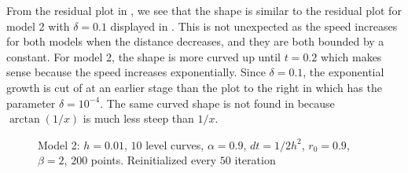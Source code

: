 From the residual plot in , we see that the shape is similar to the residual plot for model 2 with $\delta=0.1$ displayed in . This is not unexpected as the speed increases for both models when the distance decreases, and they are both bounded by a constant. For model 2, the shape is more curved up until $t=0.2$ which makes sense because the speed increases exponentially. Since $\delta=0.1$, the exponential growth is cut of at an earlier stage than the plot to the right in  which has the parameter $\delta=10^{-4}$. The same curved shape is not found in  because $\arctan(1/x)$ is much less steep than $1/x$.

\begin{figure}
    \begin{center}
    \end{center}
    \vspace{-2.5em}
    \caption[Model 3 - Circular example, $\alpha=0.9$]{Model 2: $h=0.01$, $10$ level curves, $\alpha=0.9$, $dt=1/2 h^2$, $r_0=0.9$, $\beta=2$, $200$ points. Reinitialized every $50$ iteration}
    \label{fig:model3-circle-a09}
\end{figure}

